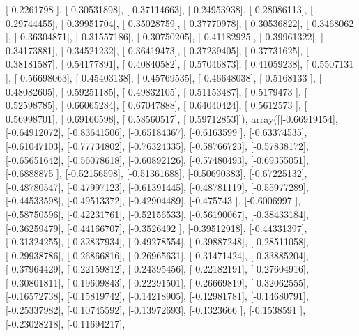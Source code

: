 \documentclass{article}
\begin{document}
       [ 0.2261798 ],
       [ 0.30531898],
       [ 0.37114663],
       [ 0.24953938],
       [ 0.28086113],
       [ 0.29744455],
       [ 0.39951704],
       [ 0.35028759],
       [ 0.37770978],
       [ 0.30536822],
       [ 0.3468062 ],
       [ 0.36304871],
       [ 0.31557186],
       [ 0.30750205],
       [ 0.41182925],
       [ 0.39961322],
       [ 0.34173881],
       [ 0.34521232],
       [ 0.36419473],
       [ 0.37239405],
       [ 0.37731625],
       [ 0.38181587],
       [ 0.54177891],
       [ 0.40840582],
       [ 0.57046873],
       [ 0.41059238],
       [ 0.5507131 ],
       [ 0.56698063],
       [ 0.45403138],
       [ 0.45769535],
       [ 0.46648038],
       [ 0.5168133 ],
       [ 0.48082605],
       [ 0.59251185],
       [ 0.49832105],
       [ 0.51153487],
       [ 0.5179473 ],
       [ 0.52598785],
       [ 0.66065284],
       [ 0.67047888],
       [ 0.64040424],
       [ 0.5612573 ],
       [ 0.56998701],
       [ 0.69160598],
       [ 0.58560517],
       [ 0.59712853]]), array([[-0.66919154],
       [-0.64912072],
       [-0.83641506],
       [-0.65184367],
       [-0.6163599 ],
       [-0.63374535],
       [-0.61047103],
       [-0.77734802],
       [-0.76324335],
       [-0.58766723],
       [-0.57838172],
       [-0.65651642],
       [-0.56078618],
       [-0.60892126],
       [-0.57480493],
       [-0.69355051],
       [-0.6888875 ],
       [-0.52156598],
       [-0.51361688],
       [-0.50690383],
       [-0.67225132],
       [-0.48780547],
       [-0.47997123],
       [-0.61391445],
       [-0.48781119],
       [-0.55977289],
       [-0.44533598],
       [-0.49513372],
       [-0.42904489],
       [-0.475743  ],
       [-0.6006997 ],
       [-0.58750596],
       [-0.42231761],
       [-0.52156533],
       [-0.56190067],
       [-0.38433184],
       [-0.36259479],
       [-0.44166707],
       [-0.3526492 ],
       [-0.39512918],
       [-0.44331397],
       [-0.31324255],
       [-0.32837934],
       [-0.49278554],
       [-0.39887248],
       [-0.28511058],
       [-0.29938786],
       [-0.26866816],
       [-0.26965631],
       [-0.31471424],
       [-0.33885204],
       [-0.37964429],
       [-0.22159812],
       [-0.24395456],
       [-0.22182191],
       [-0.27604916],
       [-0.30801811],
       [-0.19609843],
       [-0.22291501],
       [-0.26669819],
       [-0.32062555],
       [-0.16572738],
       [-0.15819742],
       [-0.14218905],
       [-0.12981781],
       [-0.14680791],
       [-0.25337982],
       [-0.10745592],
       [-0.13972693],
       [-0.1323666 ],
       [-0.1538591 ],
       [-0.23028218],
       [-0.11694217],
\end{document}
